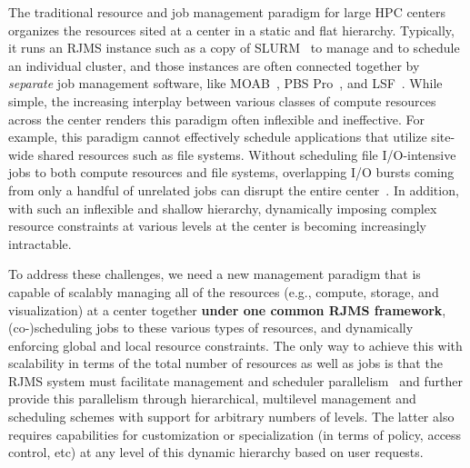 The traditional resource and job management paradigm
for large HPC centers organizes the resources sited
at a center in a static and flat hierarchy. Typically, it 
runs an RJMS instance such as a copy of SLURM~\cite{Jette02slurm}
to manage and to schedule an individual cluster,
and those instances are often connected
together by {\em separate} job management software, 
like MOAB~\cite{MOAB}, PBS Pro~\cite{PSBPro}, and LSF~\cite{LSF}.
While simple, the increasing interplay 
between various classes of compute resources 
across the center renders this paradigm often
inflexible and ineffective. 
For example, this paradigm cannot effectively
schedule applications that utilize site-wide shared 
resources such as file systems. 
Without scheduling file I/O-intensive jobs 
to both compute resources and file systems, 
overlapping I/O bursts coming from only a handful of 
unrelated jobs can disrupt the entire center~\cite{SCR,SPINDLE}. 
In addition, with such an inflexible and shallow hierarchy, 
dynamically imposing complex 
resource constraints at various levels at the center
is becoming increasingly intractable. 

To address these challenges, we need 
a new management paradigm that is capable of scalably managing 
all of the resources (e.g., compute, storage, and visualization)
at a center together {\bf under one common RJMS framework},
(co-)scheduling jobs to these various types of resources, and 
dynamically enforcing global and local resource constraints. 
The only way to achieve this with scalability in terms of the total number 
of resources as well as jobs is that the RJMS system must
facilitate management and scheduler parallelism~\cite{Omega,Mesos}
and further provide this parallelism through hierarchical, multilevel 
management and scheduling schemes with support for arbitrary numbers of levels.
The latter also requires capabilities for customization or specialization (in terms
of policy, access control, etc) at any level of this dynamic hierarchy 
based on user requests.

